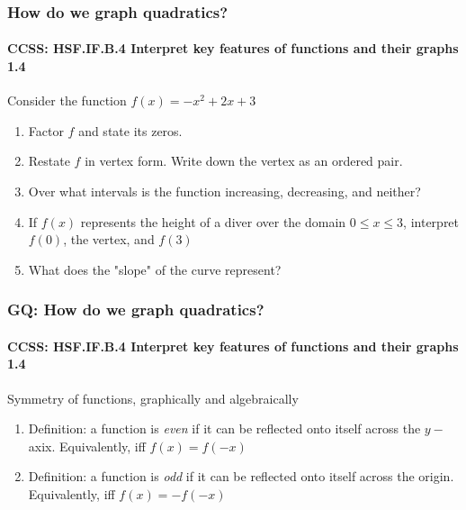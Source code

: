 \documentclass{beamer}
\begin{document}
  \frame
  {
    \frametitle{How do we graph quadratics?}
    \framesubtitle{CCSS: HSF.IF.B.4 Interpret key features of functions and their graphs   \alert{1.4}}

    \begin{block}{Consider the function $f(x)=-x^2+2x+3$}
    \begin{enumerate}
        \item Factor $f$ and state its zeros.
        \item Restate $f$ in vertex form. Write down the vertex as an ordered pair.
        \item Over what intervals is the function increasing, decreasing, and neither?
        \item If $f(x)$ represents the height of a diver over the domain $0 \leq x \leq 3$, interpret $f(0)$, the vertex, and $f(3)$
        \item What does the "slope" of the curve represent?
    \end{enumerate}
    \end{block}
  }

  \frame
  {
    \frametitle{GQ: How do we graph quadratics?}
    \framesubtitle{CCSS: HSF.IF.B.4 Interpret key features of functions and their graphs   \alert{1.4}}

    \begin{block}{Symmetry of functions, graphically and algebraically}
    \begin{enumerate}
        \item Definition: a function is \emph{even} if it can be reflected onto itself across the $y-$axix. Equivalently, iff $f(x)=f(-x)$
        \bigskip
        \item Definition: a function is \emph{odd} if it can be reflected onto itself across the origin. Equivalently, iff $f(x)=-f(-x)$
    \end{enumerate}
    \end{block}
  }
\end{document}

